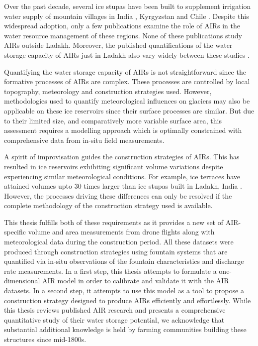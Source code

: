 Over the past decade, several ice stupas have been built to supplement irrigation water supply of mountain
villages in India \citep{wangchukIceStupaCompetition2020, palmerStoringFrozenWater2022,
aggarwalAdaptationClimateChange2021}, Kyrgyzstan \citep{bbcnewsBrightArtificialGlacier2020} and Chile
\citep{reutersConservationistsChileAim2021}. Despite this widespread adoption, only a few publications examine
the role of AIRs in the water resource management of these regions. None of these publications study AIRs
outside Ladakh. Moreover, the published quantifications of the water storage capacity of AIRs just in Ladakh
also vary widely between these studies \citep{norphelSnowWaterHarvesting2015, baglaArtificialGlaciersHelp1998}.

Quantifying the water storage capacity of AIRs is not straightforward since the formative processes of AIRs are
complex. These processes are controlled by local topography, meteorology and construction strategies used.
However, methodologies used to quantify meteorological influences on glaciers may also be applicable on these
ice reservoirs since their surface processes are similar. But due to their limited size, and comparatively more
variable surface area, this assessment requires a modelling approach which is optimally constrained with
comprehensive data from in-situ field measurements. 

A spirit of improvisation guides the construction strategies of AIRs. This has resulted in ice reservoirs
exhibiting significant volume variations despite experiencing similar meteorological conditions. For example,
ice terraces have attained volumes upto 30 times larger than ice stupas built in Ladakh, India
\cite{nusserSociohydrologyArtificialGlaciers2019}. However, the processes driving these differences can only be
resolved if the complete methodology of the construction strategy used is available.

This thesis fulfills both of these requirements as it provides a new set of AIR-specific volume and area
measurements from drone flights along with meteorological data during the construction period. All these
datasets were produced through construction strategies using fountain systems that are quantified via in-situ
observations of the fountain characteristics and discharge rate measurements. In a first step, this thesis
attempts to formulate a one-dimensional AIR model in order to calibrate and validate it with the AIR datasets.
In a second step, it attempts to use this model as a tool to propose a construction strategy designed to produce
AIRs efficiently and effortlessly. While this thesis reviews published AIR research and presents a comprehensive
quantitative study of their water storage potential, we acknowledge that substantial additional knowledge is
held by farming communities building these structures since mid-1800s.

